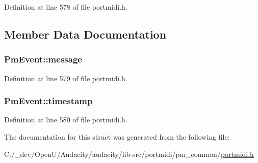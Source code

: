 Definition at line 578 of file portmidi.\+h.



\subsection{Member Data Documentation}
\subsubsection[{\texorpdfstring{message}{message}}]{ Pm\+Event\+::message}\hypertarget{struct_pm_event_a2c8c12542447fdd566401fbf1a83d4e2}{}\label{struct_pm_event_a2c8c12542447fdd566401fbf1a83d4e2}


Definition at line 579 of file portmidi.\+h.

\subsubsection[{\texorpdfstring{timestamp}{timestamp}}]{ Pm\+Event\+::timestamp}\hypertarget{struct_pm_event_a3854d39e3b89e1e2a4e1fda8d85c2f16}{}\label{struct_pm_event_a3854d39e3b89e1e2a4e1fda8d85c2f16}


Definition at line 580 of file portmidi.\+h.



The documentation for this struct was generated from the following file\+:\begin{DoxyCompactItemize}
\item 
C\+:/\+\_\+dev/\+Open\+U/\+Audacity/audacity/lib-\/src/portmidi/pm\+\_\+common/\hyperlink{portmidi_8h}{portmidi.\+h}\end{DoxyCompactItemize}
